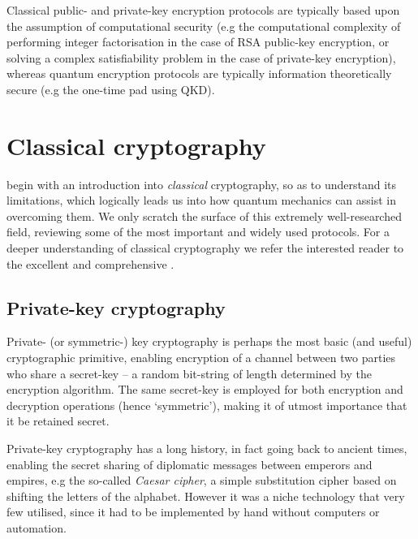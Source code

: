 Classical public- and private-key encryption protocols are typically based upon the assumption of computational security (e.g the computational complexity of performing integer factorisation in the case of RSA public-key encryption, or solving a complex satisfiability problem in the case of private-key encryption), whereas quantum encryption protocols are typically information theoretically secure (e.g the one-time pad using QKD).

%
%

\section{Classical cryptography}

 begin with an introduction into \textit{classical} cryptography, so as to understand its limitations, which logically leads us into how quantum mechanics can assist in overcoming them. We only scratch the surface of this extremely well-researched field, reviewing some of the most important and widely used protocols. For a deeper understanding of classical cryptography we refer the interested reader to the excellent and comprehensive \cite{bib:Schneier96}.

%
%

\subsection{Private-key cryptography}

Private- (or symmetric-) key cryptography is perhaps the most basic (and useful) cryptographic primitive, enabling encryption of a channel between two parties who share a secret-key -- a random bit-string of length determined by the encryption algorithm. The same secret-key is employed for both encryption and decryption operations (hence `symmetric'), making it of utmost importance that it be retained secret.

Private-key cryptography has a long history, in fact going back to ancient times, enabling the secret sharing of diplomatic messages between emperors and empires, e.g the so-called \textit{Caesar cipher}, a simple substitution cipher based on shifting the letters of the alphabet. However it was a niche technology that very few utilised, since it had to be implemented by hand without computers or automation.

